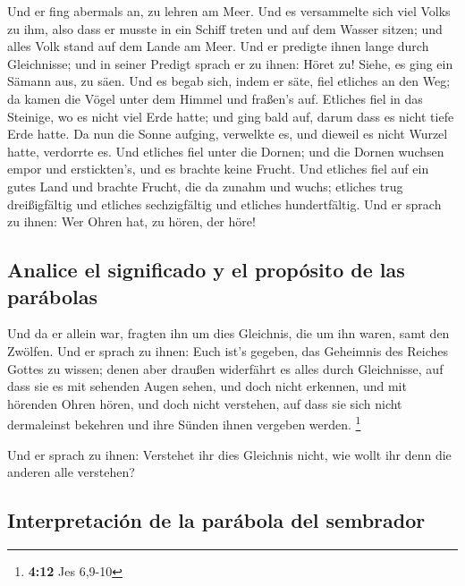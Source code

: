  Und er fing abermals an, zu lehren am Meer. Und es
versammelte sich viel Volks zu ihm, also dass er musste in ein Schiff
treten und auf dem Wasser sitzen; und alles Volk stand auf dem Lande am
Meer.  Und er predigte ihnen lange durch Gleichnisse; und
in seiner Predigt sprach er zu ihnen:  Höret zu! Siehe, es
ging ein Sämann aus, zu säen.  Und es begab sich, indem er
säte, fiel etliches an den Weg; da kamen die Vögel unter dem Himmel und
fraßen's auf.  Etliches fiel in das Steinige, wo es nicht
viel Erde hatte; und ging bald auf, darum dass es nicht tiefe Erde
hatte.  Da nun die Sonne aufging, verwelkte es, und
dieweil es nicht Wurzel hatte, verdorrte es.  Und etliches
fiel unter die Dornen; und die Dornen wuchsen empor und erstickten's,
und es brachte keine Frucht.  Und etliches fiel auf ein
gutes Land und brachte Frucht, die da zunahm und wuchs; etliches trug
dreißigfältig und etliches sechzigfältig und etliches hundertfältig.
 Und er sprach zu ihnen: Wer Ohren hat, zu hören, der
höre!

\hypertarget{analice-el-significado-y-el-propuxf3sito-de-las-paruxe1bolas}{%
\subsection{Analice el significado y el propósito de las
parábolas}\label{analice-el-significado-y-el-propuxf3sito-de-las-paruxe1bolas}}

 Und da er allein war, fragten ihn um dies Gleichnis, die
um ihn waren, samt den Zwölfen.  Und er sprach zu ihnen:
Euch ist's gegeben, das Geheimnis des Reiches Gottes zu wissen; denen
aber draußen widerfährt es alles durch Gleichnisse,  auf
dass sie es mit sehenden Augen sehen, und doch nicht erkennen, und mit
hörenden Ohren hören, und doch nicht verstehen, auf dass sie sich nicht
dermaleinst bekehren und ihre Sünden ihnen vergeben werden. \footnote{\textbf{4:12}
  Jes 6,9-10}

 Und er sprach zu ihnen: Verstehet ihr dies Gleichnis
nicht, wie wollt ihr denn die anderen alle verstehen?

\hypertarget{interpretaciuxf3n-de-la-paruxe1bola-del-sembrador}{%
\subsection{Interpretación de la parábola del
sembrador}\label{interpretaciuxf3n-de-la-paruxe1bola-del-sembrador}}

